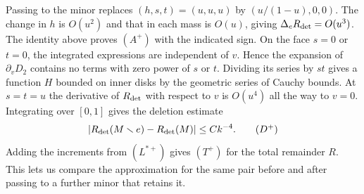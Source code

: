 Passing to the minor replaces $(h,s,t)=(u,u,u)$ by $(u/(1-u),0,0)$. The change in $h$ is $O(u^2)$
and that in each mass is $O(u)$, giving $\Delta_e R_{\rm det}=O(u^3)$. The identity above proves
$(A^+)$ with the indicated sign. On the face $s=0$ or $t=0$, the integrated expressions are
independent of $v$. Hence the expansion of $\partial_vD_2$ contains no terms with zero power of
$s$ or $t$. Dividing its series by $st$ gives a function $H$ bounded on inner disks by the
geometric series of Cauchy bounds. At $s=t=u$ the derivative of $R_{\rm det}$ with respect to $v$
is $O(u^4)$ all the way to $v=0$. Integrating over $[0,1]$ gives the deletion estimate
\[
 |R_{\rm det}(M\setminus e)-R_{\rm det}(M)|\le Ck^{-4}. \tag{$D^+$}
\]
Adding the increments from $(L^{*+})$ gives $(T^+)$ for the total remainder $R$. This lets us
compare the approximation for the same pair before and after passing to a further minor that
retains it.
